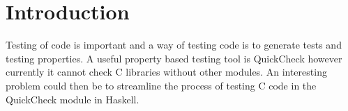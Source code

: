 \section{Introduction}

Testing of code is important and a way of testing code is to generate tests and testing properties.
A useful property based testing tool is QuickCheck however currently it cannot check C libraries without other modules. %
An interesting problem could then be to streamline the process of testing C code in the QuickCheck module in Haskell.





